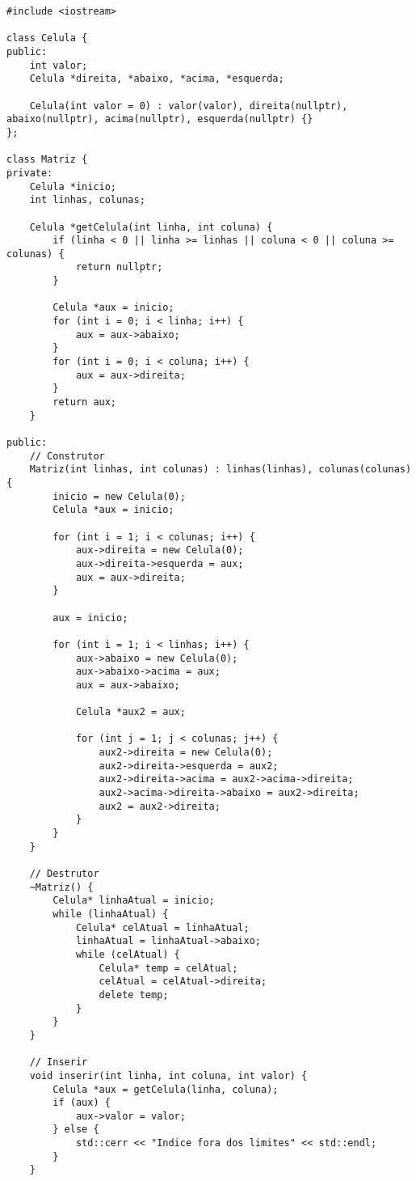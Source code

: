 \documentclass{article}
\begin{document}
\lstset{language=C++}
\begin{lstlisting}
#include <iostream>

class Celula {
public:
    int valor;
    Celula *direita, *abaixo, *acima, *esquerda;

    Celula(int valor = 0) : valor(valor), direita(nullptr), abaixo(nullptr), acima(nullptr), esquerda(nullptr) {}
};

class Matriz {
private:
    Celula *inicio;
    int linhas, colunas;

    Celula *getCelula(int linha, int coluna) {
        if (linha < 0 || linha >= linhas || coluna < 0 || coluna >= colunas) {
            return nullptr;
        }

        Celula *aux = inicio;
        for (int i = 0; i < linha; i++) {
            aux = aux->abaixo;
        }
        for (int i = 0; i < coluna; i++) {
            aux = aux->direita;
        }
        return aux;
    }

public:
    // Construtor
    Matriz(int linhas, int colunas) : linhas(linhas), colunas(colunas) {
        inicio = new Celula(0);
        Celula *aux = inicio;

        for (int i = 1; i < colunas; i++) {
            aux->direita = new Celula(0);
            aux->direita->esquerda = aux;
            aux = aux->direita;
        }

        aux = inicio;

        for (int i = 1; i < linhas; i++) {
            aux->abaixo = new Celula(0);
            aux->abaixo->acima = aux;
            aux = aux->abaixo;

            Celula *aux2 = aux;

            for (int j = 1; j < colunas; j++) {
                aux2->direita = new Celula(0);
                aux2->direita->esquerda = aux2;
                aux2->direita->acima = aux2->acima->direita;
                aux2->acima->direita->abaixo = aux2->direita;
                aux2 = aux2->direita;
            }
        }
    }

    // Destrutor
    ~Matriz() {
        Celula* linhaAtual = inicio;
        while (linhaAtual) {
            Celula* celAtual = linhaAtual;
            linhaAtual = linhaAtual->abaixo;
            while (celAtual) {
                Celula* temp = celAtual;
                celAtual = celAtual->direita;
                delete temp;
            }
        }
    }

    // Inserir
    void inserir(int linha, int coluna, int valor) {
        Celula *aux = getCelula(linha, coluna);
        if (aux) {
            aux->valor = valor;
        } else {
            std::cerr << "Indice fora dos limites" << std::endl;
        }
    }


\end{lstlisting}
\end{document}
